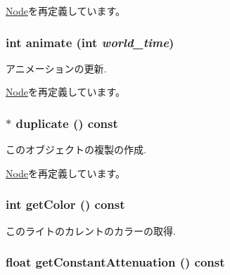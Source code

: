\hyperlink{classm3g_1_1Node_415c0b110f95410ded9b85e5d99a496b}{Node}を再定義しています。\hypertarget{classm3g_1_1Light_8aad1ceab4c2a03609c8a42324ce484d}{
\subsubsection[{animate}]{\setlength{\rightskip}{0pt plus 5cm}int animate (int {\em world\_\-time})}}
\label{classm3g_1_1Light_8aad1ceab4c2a03609c8a42324ce484d}


アニメーションの更新. 

\hyperlink{classm3g_1_1Node_8aad1ceab4c2a03609c8a42324ce484d}{Node}を再定義しています。\hypertarget{classm3g_1_1Light_7a41af040d0c1566358d84f089cd0cd1}{
\subsubsection[{duplicate}]{ $\ast$ duplicate () const}}
\label{classm3g_1_1Light_7a41af040d0c1566358d84f089cd0cd1}


このオブジェクトの複製の作成. 

\hyperlink{classm3g_1_1Node_0b9f7531a4b56d34f47aeb1fff0d37e0}{Node}を再定義しています。\hypertarget{classm3g_1_1Light_4cfa1931c265ec3412fe3f6408a1b4f5}{
\subsubsection[{getColor}]{\setlength{\rightskip}{0pt plus 5cm}int getColor () const}}
\label{classm3g_1_1Light_4cfa1931c265ec3412fe3f6408a1b4f5}


このライトのカレントのカラーの取得. \hypertarget{classm3g_1_1Light_9553ab96cb7639acafcebb81888af687}{
\subsubsection[{getConstantAttenuation}]{\setlength{\rightskip}{0pt plus 5cm}float getConstantAttenuation () const}}
\label{classm3g_1_1Light_9553ab96cb7639acafcebb81888af687}



